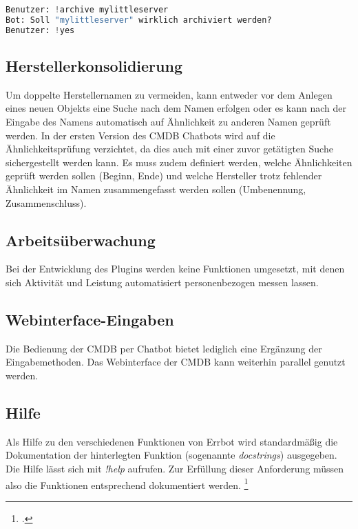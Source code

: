 \begin{lstlisting}[language=python, label=delconfirm, caption=Nachfrage bei der Archivierung von Objekten]
Benutzer: !archive mylittleserver
Bot: Soll "mylittleserver" wirklich archiviert werden?
Benutzer: !yes
\end{lstlisting}

\subsection{Herstellerkonsolidierung}
Um doppelte Herstellernamen zu vermeiden, kann entweder vor dem Anlegen eines neuen Objekts eine Suche nach dem Namen erfolgen oder es kann nach der Eingabe des Namens automatisch auf Ähnlichkeit zu anderen Namen geprüft werden.
In der ersten Version des \acs{CMDB} Chatbots wird auf die Ähnlichkeitsprüfung verzichtet, da dies auch mit einer zuvor getätigten Suche sichergestellt werden kann. Es muss zudem definiert werden, welche Ähnlichkeiten geprüft werden sollen (Beginn, Ende) und welche Hersteller trotz fehlender Ähnlichkeit im Namen zusammengefasst werden sollen (Umbenennung, Zusammenschluss).

\subsection{Arbeitsüberwachung}
Bei der Entwicklung des Plugins werden keine Funktionen umgesetzt, mit denen sich Aktivität und Leistung automatisiert personenbezogen messen lassen. 

\subsection{Webinterface-Eingaben}
Die Bedienung der \acs{CMDB} per Chatbot bietet lediglich eine Ergänzung der Eingabemethoden. Das Webinterface der \acs{CMDB} kann weiterhin parallel genutzt werden.

\subsection{Hilfe}
Als Hilfe zu den verschiedenen Funktionen von Errbot wird standardmäßig die Dokumentation der hinterlegten Funktion (sogenannte \textit{docstrings}) ausgegeben. Die Hilfe lässt sich mit \textit{!help} aufrufen. Zur Erfüllung dieser Anforderung müssen also die Funktionen entsprechend dokumentiert werden.
\footcites[Vgl.][o. \pno]{errbot_2018_general}[Vgl.][o. \pno]{pep257}

